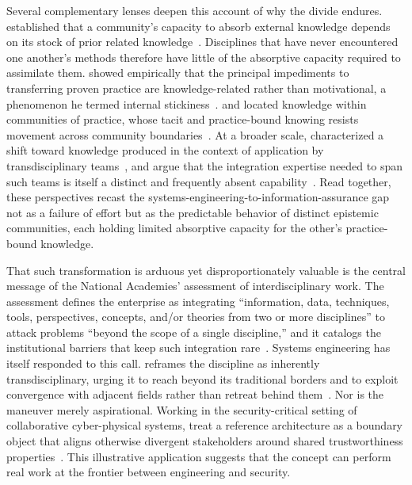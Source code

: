 Several complementary lenses deepen this account of why the divide endures. \citeauthor{Cohen_Levinthal_1990} established that a community's capacity to absorb external knowledge depends on its stock of prior related knowledge~\parencite{Cohen_Levinthal_1990}. Disciplines that have never encountered one another's methods therefore have little of the absorptive capacity required to assimilate them. \citeauthor{Szulanski_1996} showed empirically that the principal impediments to transferring proven practice are knowledge-related rather than motivational, a phenomenon he termed internal stickiness~\parencite{Szulanski_1996}. \citeauthor{Brown_Duguid_1991} and \citeauthor{Wenger_1998} located knowledge within communities of practice, whose tacit and practice-bound knowing resists movement across community boundaries~\parencite{Brown_Duguid_1991, Wenger_1998}. At a broader scale, \citeauthor{Gibbons_1994} characterized a shift toward knowledge produced in the context of application by transdisciplinary teams~\parencite{Gibbons_1994}, and \citeauthor{Bammer_2020} argue that the integration expertise needed to span such teams is itself a distinct and frequently absent capability~\parencite{Bammer_2020}. Read together, these perspectives recast the systems-engineering-to-information-assurance gap not as a failure of effort but as the predictable behavior of distinct epistemic communities, each holding limited absorptive capacity for the other's practice-bound knowledge.

That such transformation is arduous yet disproportionately valuable is the central message of the National Academies' assessment of interdisciplinary work. The assessment defines the enterprise as integrating ``information, data, techniques, tools, perspectives, concepts, and/or theories from two or more disciplines'' to attack problems ``beyond the scope of a single discipline,'' and it catalogs the institutional barriers that keep such integration rare~\parencite{NRC_Interdisciplinary_2005}. Systems engineering has itself responded to this call. \citeauthor{Madni_TSE_2018} reframes the discipline as inherently transdisciplinary, urging it to reach beyond its traditional borders and to exploit convergence with adjacent fields rather than retreat behind them~\parencite{Madni_TSE_2018, Madni_2019_TSE}. Nor is the maneuver merely aspirational. Working in the security-critical setting of collaborative cyber-physical systems, \citeauthor{Ramli_2021_BoundaryObjects} treat a reference architecture as a boundary object that aligns otherwise divergent stakeholders around shared trustworthiness properties~\parencite{Ramli_2021_BoundaryObjects}. This illustrative application suggests that the concept can perform real work at the frontier between engineering and security.


